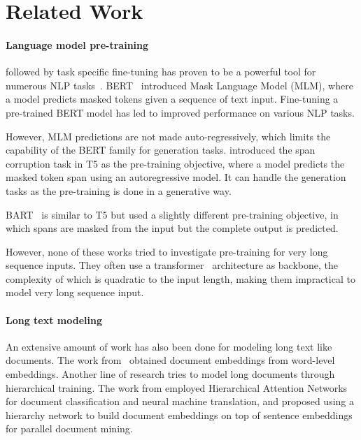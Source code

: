 \section{Related Work}\label{sec:related}

\paragraph{Language model pre-training} followed by task specific fine-tuning has proven to be a powerful tool for numerous NLP tasks~\cite{devlin-etal-2019-bert,liu2019roberta,zhang-etal-2019-ernie,Radford2019LanguageMA,t5,lewis-etal-2020-bart,joshi-etal-2020-spanbert}. BERT~\cite{devlin-etal-2019-bert} introduced Mask Language Model (MLM), where a model predicts masked tokens given a sequence of text input. Fine-tuning a pre-trained BERT model has led to improved performance on various NLP tasks.

However, MLM predictions are not made auto-regressively, which limits the capability of the BERT family for generation tasks.
\citet{t5} introduced the span corruption task in T5 as the pre-training objective, where a model predicts the masked token span using an autoregressive model. It can handle the generation tasks as the pre-training is done in a generative way.

BART~\cite{lewis-etal-2020-bart} is similar to T5 but used a slightly different pre-training objective, in which spans are masked from the input but the complete output is predicted. 

However, none of these works tried to investigate pre-training for very long sequence inputs. They often use a transformer~\cite{transformer} architecture as backbone, the complexity of which is quadratic to the input length, making them impractical to model very long sequence input.

\paragraph{Long text modeling} An extensive amount of work has also been done for modeling long text like documents. The work from~\citet{roy2016,chen2017,wu2018} obtained document embeddings from word-level embeddings. Another line of research tries to model long documents through hierarchical training. The work from \citet{yang-etal-2016-hierarchical,miculicich-etal-2018-document} employed Hierarchical Attention Networks for document classification and neural machine translation, and \citet{guo-etal-2019-hierarchical} proposed using a hierarchy network to build document embeddings on top of sentence embeddings for parallel document mining. 

